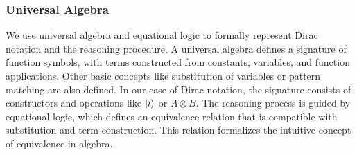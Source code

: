 




\subsubsection{Universal Algebra}
We use universal algebra and equational logic to formally represent Dirac notation and the reasoning procedure. A universal algebra defines a signature of function symbols, with terms constructed from constants, variables, and function applications. 
Other basic concepts like substitution of variables or pattern matching are also defined.
In our case of Dirac notation, the signature consists of constructors and operations like $\ket{i}$ or $A \otimes B$.
The reasoning process is guided by equational logic, which defines an equivalence relation that is compatible with substitution and term construction. This relation formalizes the intuitive concept of equivalence in algebra.

